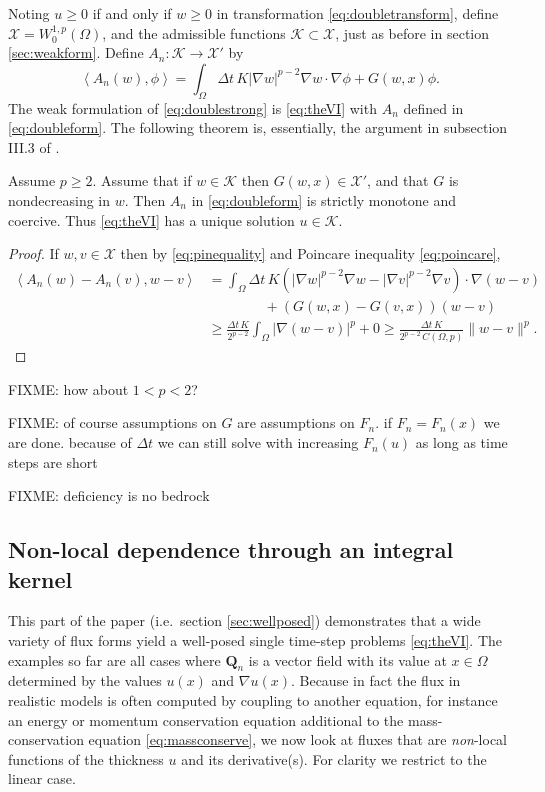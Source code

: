 \documentclass[final,leqno,onefignum,onetabnum]{siamltex1213bueler}
\newcommand\bQ{\mathbf{Q}}
\renewcommand{\grad}{\nabla}
\newcommand{\ip}[2]{\ensuremath{\left<#1,#2\right>}}
\begin{document}
Noting $u\ge 0$ if and only if $w\ge 0$ in transformation \eqref{eq:doubletransform}, define $\mathcal{X} = W_0^{1,p}(\Omega)$, and the admissible functions $\mathcal{K}\subset \mathcal{X}$, just as before in section \ref{sec:weakform}.  Define $A_n: \mathcal{K} \to \mathcal{X}'$ by
\begin{equation}
\ip{A_n(w)}{\phi} = \int_\Omega \Delta t\, K |\grad w|^{p-2} \grad w\cdot \grad \phi + G(w,x)\phi. \label{eq:doubleform}
\end{equation}
The weak formulation of \eqref{eq:doublestrong} is \eqref{eq:theVI} with $A_n$ defined in \eqref{eq:doubleform}.  The following theorem is, essentially, the argument in subsection III.3 of \cite{KinderlehrerStampacchia}.

\begin{theorem}
Assume $p\ge 2$.  Assume that if $w\in\mathcal{K}$ then $G(w,x)\in \mathcal{X}'$, and that $G$ is nondecreasing in $w$.  Then $A_n$ in \eqref{eq:doubleform} is strictly monotone and coercive.  Thus \eqref{eq:theVI} has a unique solution $u\in\mathcal{K}$.
\end{theorem}

\begin{proof}
If $w,v\in\mathcal{X}$ then by \eqref{eq:pinequality} and Poincare inequality \eqref{eq:poincare},
\begin{align*}
\ip{A_n(w)-A_n(v)}{w-v} &= \int_\Omega \Delta t\, K \left(|\grad w|^{p-2} \grad w - |\grad v|^{p-2} \grad v\right) \cdot \grad (w-v) \\
  &\qquad\qquad + \left(G(w,x) - G(v,x)\right) (w-v) \\
  &\ge \frac{\Delta t\,K}{2^{p-2}} \int_\Omega |\grad (w-v)|^p + 0 \ge \frac{\Delta t\,K}{2^{p-2}\, C(\Omega,p)} \|w-v\|^p.
\end{align*}
\end{proof}

FIXME: how about $1<p<2$?

FIXME: of course assumptions on $G$ are assumptions on $F_n$.  if $F_n=F_n(x)$ we are done. because of $\Delta t$ we can still solve with increasing $F_n(u)$ as long as time steps are short

FIXME: deficiency is no bedrock


\subsection{Non-local dependence through an integral kernel} \label{subsec:nonlocal}   This part of the paper (i.e.~section \ref{sec:wellposed}) demonstrates that a wide variety of flux forms yield a well-posed single time-step problems \eqref{eq:theVI}.  The examples so far are all cases where $\bQ_n$ is a vector field with its value at $x\in\Omega$ determined by the values $u(x)$ and $\grad u(x)$.  Because in fact the flux in realistic models is often computed by coupling to another equation, for instance an energy or momentum conservation equation additional to the mass-conservation equation \eqref{eq:massconserve}, we now look at fluxes that are \emph{non}-local functions of the thickness $u$ and its derivative(s).  For clarity we restrict to the linear case.
\end{document}
